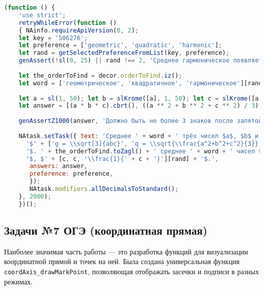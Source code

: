 \begin{lstlisting}[language=JavaScript]
(function () { 
    'use strict'; 
    retryWhileError(function () 
    { NAinfo.requireApiVersion(0, 2); 
    let key = '506276'; 
    let preference = ['geometric', 'quadratic', 'harmonic']; 
    let rand = getSelectedPreferenceFromList(key, preference);
    genAssert(!sl(0, 25) || rand !== 2, 'Среднее гармоническое появляется слишком часто'); 
     
    let the_orderToFind = decor.orderToFind.iz(); 
    let word = ['геометрическое', 'квадратичное', 'гармоническое'][rand]; 
     
    let a = sl(1, 50); let b = slKrome([a], 1, 50); let c = slKrome([a, b], 1, 50); 
    let answer = [(a * b * c).cbrt(), ((a ** 2 + b ** 2 + c ** 2) / 3).sqrt(), 3 / (a + b + c)][rand];
     
    genAssertZ1000(answer, 'Должно быть не более 3 знаков после запятой'); 
     
    NAtask.setTask({ text: 'Среднее ' + word + ' трёх чисел $a$, $b$ и $c$ вычисляется по формуле ' +
      '$' + ['g = \\sqrt[3]{abc}', 'q = \\sqrt{\\frac{a^2+b^2+c^2}{3}}', 'h = \\left(\\frac{\\frac{1}{a}+\\frac{1}{b}+\\frac{1}{c}}{3} \\right)^{-1}'][rand] + '$.' +
      '$. ' + the_orderToFind.toZagl() + ' среднее ' + word + ' чисел $' + [a, a, '\\frac{1}{' + a + '}'][rand] + '$, $' + [b, b, '\\frac{1}{' + b + '}'][rand] + 
      '$, $' + [c, c, '\\frac{1}{' + c + '}'][rand] + '$.',
       answers: answer, 
       preference: preference, 
       }); 
       NAtask.modifiers.allDecimalsToStandard();
    }, 2000); 
    })();
\end{lstlisting}

\subsection{Задачи №7 ОГЭ (координатная прямая)}

Наиболее значимая часть работы — это разработка функций для визуализации координатной прямой и точек на ней. 
Была создана универсальная функция \texttt{coordAxis\_drawMarkPoint}, позволяющая отображать засечки и подписи в разных режимах.
